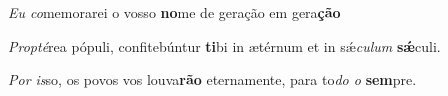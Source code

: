 \begin{greenumerate}
  \switchcolumn%

  \item \textit{Eu co}memorarei o vosso \textbf{no}me {\GreStar} de geração em gera\-\textbf{ção} 

  \switchcolumn*


  \item \textit{Propté}rea pópuli, confitebúntur \textbf{ti}bi {\GreStar} in ætérnum et in sǽ\textit{culum} \textbf{sǽ}culi. 

  \switchcolumn%

  \item \textit{Por is}so, os povos vos louva\textbf{rão} {\GreStar} eternamente, para to\textit{do o} \textbf{sem}pre. 
\end{greenumerate}
